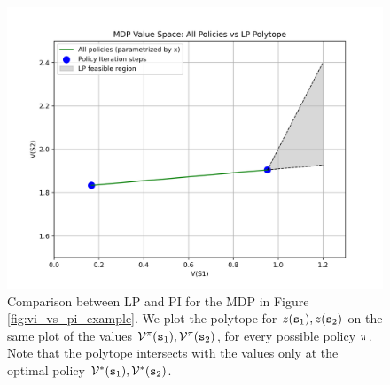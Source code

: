 \begin{example}
\begin{figure}[H]
    \centering
    \includegraphics[width=0.8\linewidth]{figures/pi_vs_lp.png}
    \caption{Comparison between LP and PI for the MDP in Figure \ref{fig:vi_vs_pi_example}. We plot the polytope for $z({\tt s}_1), z({\tt s}_2)$ on the same plot of the values $\mathcal{V}^\pi({\tt s}_1), \mathcal{V}^\pi({\tt s}_2)$, for every possible policy $\pi$. Note that the polytope intersects with the values only at the optimal policy $\mathcal{V}^*({\tt s}_1), \mathcal{V}^*({\tt s}_2)$.}
    \label{fig:pi_vs_lp_plot}
\end{figure}
\end{example}

%
%
%
%

